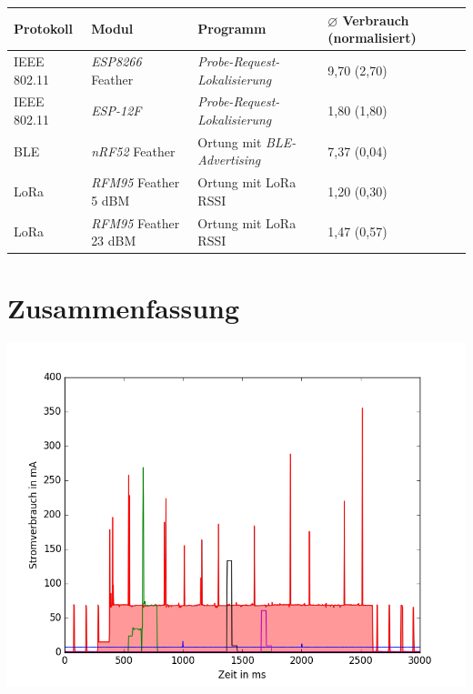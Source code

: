 \documentclass[18pt]{beamer}
\begin{document}
\begin{frame}
	\begin{tabular}{l|p{3cm}|p{3cm}|R{2.1cm}}
		Protokoll & Modul & Programm  & $\varnothing$ Verbrauch (normalisiert)\\
		\hline
		IEEE 802.11 & \emph{ESP8266} Feather & \emph{Probe-Request-Lokalisierung} & 9,70 (2,70)\\
		IEEE 802.11 & \emph{ESP-12F} & \emph{Probe-Request-Lokalisierung} & 1,80 (1,80)\\
		\hline
		BLE & \emph{nRF52} Feather & Ortung mit \emph{BLE-Advertising} & 7,37 (0,04)\\
		\hline
		LoRa & \emph{RFM95} Feather 5 dBM & Ortung mit LoRa RSSI & 1,20 (0,30)\\
		LoRa & \emph{RFM95} Feather 23 dBM & Ortung mit LoRa RSSI & 1,47 (0,57)\\
	\end{tabular}
\end{frame}

\section{Zusammenfassung}
\begin{frame}
	\begin{minipage}[c][\textheight][c]{\textwidth}
		\centering
		\includegraphics[height=0.95\textheight]{plots/alle.png}
	\end{minipage}
\end{frame}
\end{document}
